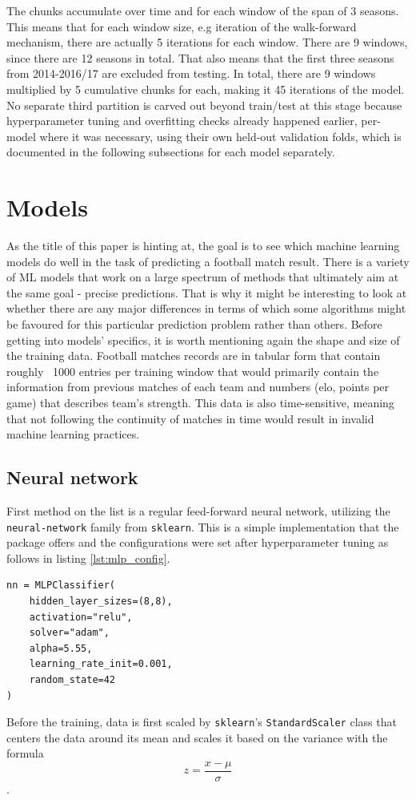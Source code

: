 \documentclass{article}
\begin{document}
The chunks accumulate over time and for each window of the span of 3 seasons. This means that for each window size, e.g iteration of the walk-forward mechanism, there are actually 5 iterations for each window. There are 9 windows, since there are 12 seasons in total. That also means that the first three seasons from 2014-2016/17 are excluded from testing. In total, there are 9 windows multiplied by 5 cumulative chunks for each, making it 45 iterations of the model. No separate third partition is carved out beyond train/test at this stage because hyperparameter tuning and overfitting checks already happened earlier, per-model where it was necessary, using their own held-out validation folds, which is documented in the following subsections for each model separately.  

\section{Models}
As the title of this paper is hinting at, the goal is to see which machine learning models do well in the task of predicting a football match result. There is a variety of ML models that work on a large spectrum of methods that ultimately aim at the same goal - precise predictions. That is why it might be interesting to look at whether there are any major differences in terms of which some algorithms might be favoured for this particular prediction problem rather than others. Before getting into models' specifics, it is worth mentioning again the shape and size of the training data. Football matches records are in tabular form that contain roughly ~1000 entries per training window that would primarily contain the information from previous matches of each team and numbers (elo, points per game) that describes team's strength. This data is also time-sensitive, meaning that not following the continuity of matches in time would result in invalid machine learning practices.




\subsection{Neural network}
First method on the list is a regular feed-forward neural network, utilizing the \texttt{neural-network} family from \texttt{sklearn}. This is a simple implementation that the package offers and the configurations were set after hyperparameter tuning as follows in listing \ref{lst:mlp_config}.

\begin{lstlisting}[style=pythonstyle, caption={FFNN configuration}, label={lst:mlp_config}]
nn = MLPClassifier(
    hidden_layer_sizes=(8,8),
    activation="relu",
    solver="adam",
    alpha=5.55,
    learning_rate_init=0.001,
    random_state=42
)
\end{lstlisting}
Before the training, data is first scaled by \texttt{sklearn}'s \texttt{StandardScaler} class that centers the data around its mean and scales it based on the variance with the formula 
\begin{equation}
z = \frac{x - \mu}{\sigma}
\end{equation}.
\end{document}
